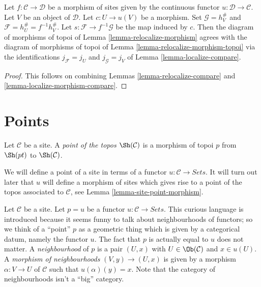 \begin{lemma}
\label{lemma-relocalize-morphism-compare}
Let $f : \mathcal{C} \to \mathcal{D}$ be a morphism of sites given
by the continuous functor $u : \mathcal{D} \to \mathcal{C}$.
Let $V$ be an object of $\mathcal{D}$. Let $c : U \to u(V)$ be a morphism.
Set $\mathcal{G} = h_V^\#$ and $\mathcal{F} = h_U^\# = f^{-1}h_V^\#$.
Let $s : \mathcal{F} \to f^{-1}\mathcal{G}$ be the map induced by $c$.
Then the diagram of morphisms of topoi of
Lemma \ref{lemma-relocalize-morphism}
agrees with the diagram of morphisms of topoi of
Lemma \ref{lemma-relocalize-morphism-topoi}
via the identifications $j_\mathcal{F} = j_U$
and $j_\mathcal{G} = j_V$ of
Lemma \ref{lemma-localize-compare}.
\end{lemma}

\begin{proof}
This follows on combining
Lemmas \ref{lemma-relocalize-compare} and
\ref{lemma-localize-morphism-compare}.
\end{proof}


















\section{Points}
\label{section-points}

\begin{definition}
\label{definition-point-topos}
Let $\mathcal{C}$ be a site.
A {\it point of the topos $\Sh(\mathcal{C})$}
is a morphism of topoi $p$ from $\Sh(pt)$ to
$\Sh(\mathcal{C})$.
\end{definition}

\noindent
We will define a point of a site in terms of a functor
$u : \mathcal{C} \to \textit{Sets}$.
It will turn out later that $u$ will define a morphism of sites
which gives rise to a point of the topos associated to $\mathcal{C}$, see
Lemma \ref{lemma-site-point-morphism}.

\medskip\noindent
Let $\mathcal{C}$ be a site. Let $p = u$ be
a functor $u : \mathcal{C} \to \textit{Sets}$.
This curious language is introduced because it
seems funny to talk about neighbourhoods of functors;
so we think of a ``point'' $p$ as a geometric thing which
is given by a categorical datum, namely the functor $u$.
The fact that $p$ is actually equal to $u$ does not matter.
A {\it neighbourhood} of $p$ is a pair $(U, x)$ with
$U \in \Ob(\mathcal{C})$ and $x \in u(U)$.
A {\it morphism of neighbourhoods} $(V, y) \to (U, x)$
is given by a morphism $\alpha :V \to U$ of $\mathcal{C}$
such that $u(\alpha)(y) = x$. Note that the category of
neighbourhoods isn't a ``big'' category.

